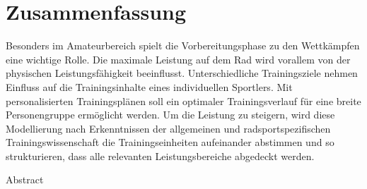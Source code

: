 \chapter*{Zusammenfassung}
\label{sec:abstract}
\vspace*{-10mm}
Besonders im Amateurbereich spielt die Vorbereitungsphase zu den Wettkämpfen eine wichtige Rolle. Die maximale Leistung auf dem Rad wird vorallem von der physischen Leistungsfähigkeit beeinflusst. Unterschiedliche Trainingsziele nehmen Einfluss auf die Trainingsinhalte eines individuellen Sportlers. Mit personalisierten Trainingsplänen soll ein optimaler Trainingsverlauf für eine breite Personengruppe ermöglicht werden.
Um die Leistung zu steigern, wird diese Modellierung nach Erkenntnissen der allgemeinen und radsportspezifischen Trainingswissenschaft die Trainingseinheiten aufeinander abstimmen und so strukturieren, dass alle relevanten Leistungsbereiche abgedeckt werden.
\vspace*{20mm}

{Abstract}\label{sec:abstract-diff} \\
\vspace*{-10mm}
